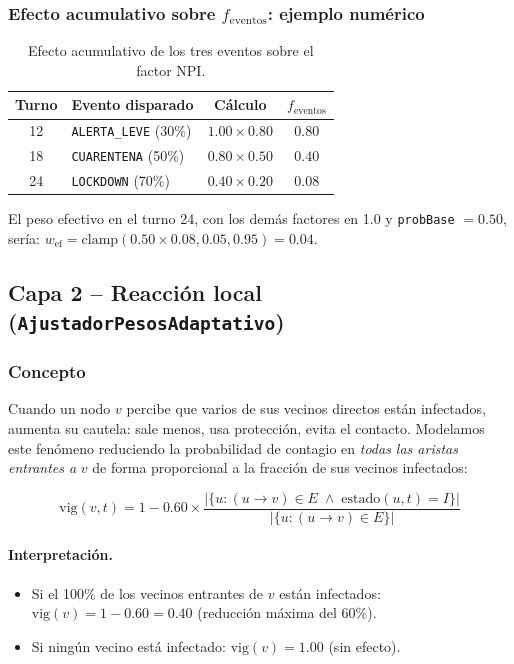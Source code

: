 \documentclass[spanish,notitlepage,letterpaper, 12pt]{article}
\begin{document}
\subsubsection{Efecto acumulativo sobre $f_{\text{eventos}}$: ejemplo num\'erico}

\begin{table}[H]
\centering
\caption{Efecto acumulativo de los tres eventos sobre el factor NPI.}
\label{tab:efecto_acumulado}
\begin{tabular}{c l c c}
\toprule
\textbf{Turno} & \textbf{Evento disparado} & \textbf{C\'alculo} & \textbf{$f_{\text{eventos}}$} \\
\midrule
12 & \texttt{ALERTA\_LEVE} (30\%) & $1.00 \times 0.80$ & $0.80$ \\
18 & \texttt{CUARENTENA} (50\%) & $0.80 \times 0.50$ & $0.40$ \\
24 & \texttt{LOCKDOWN} (70\%) & $0.40 \times 0.20$ & $0.08$ \\
\bottomrule
\end{tabular}
\end{table}

El peso efectivo en el turno 24, con los dem\'as factores en 1.0 y \texttt{probBase} $= 0.50$, ser\'ia:
$w_{\text{ef}} = \mathrm{clamp}(0.50 \times 0.08, 0.05, 0.95) = 0.04$.

\subsection{Capa 2 -- Reacci\'on local (\texttt{AjustadorPesosAdaptativo})}
\label{sec:vigilancia}

\subsubsection{Concepto}

Cuando un nodo $v$ percibe que varios de sus vecinos directos est\'an infectados, aumenta su cautela: sale menos, usa protecci\'on, evita el contacto. Modelamos este fen\'omeno reduciendo la probabilidad de contagio en \emph{todas las aristas entrantes a} $v$ de forma proporcional a la fracci\'on de sus vecinos infectados:

\begin{equation}
\mathrm{vig}(v,t) = 1 - 0.60 \times \frac{|\{u : (u{\to}v)\in E \;\wedge\; \mathrm{estado}(u,t) = I\}|}{|\{u : (u{\to}v)\in E\}|}
\label{eq:vigilancia}
\end{equation}

\paragraph{Interpretaci\'on.}
\begin{itemize}
    \item Si el 100\% de los vecinos entrantes de $v$ est\'an infectados: $\mathrm{vig}(v) = 1 - 0.60 = 0.40$ (reducci\'on m\'axima del 60\%).
    \item Si ning\'un vecino est\'a infectado: $\mathrm{vig}(v) = 1.00$ (sin efecto).
\end{itemize}
\end{document}
